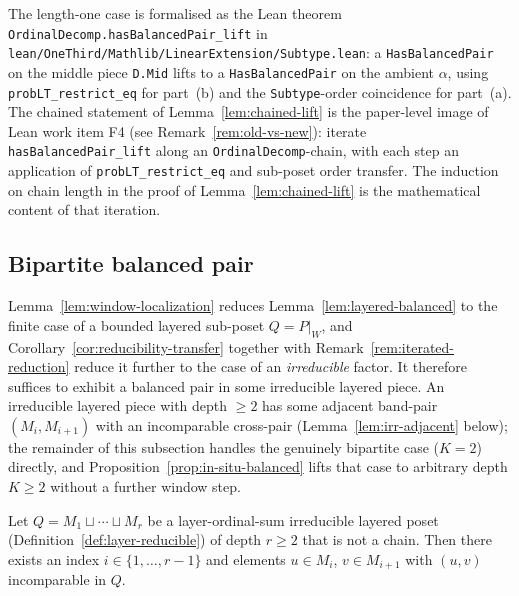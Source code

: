 \begin{remark}
\label{rem:chained-lift-lean}
The length-one case is formalised as the Lean theorem
\texttt{OrdinalDecomp.}\allowbreak\texttt{has\-Balanced\-Pair\_lift}
in \texttt{lean/OneThird/Mathlib/}\allowbreak\texttt{LinearExtension/Subtype.lean}:
a \texttt{HasBalancedPair} on the middle piece \texttt{D.Mid} lifts
to a \texttt{HasBalancedPair} on the ambient $\alpha$, using
\texttt{probLT\_restrict\_eq} for part~(b) and the
\texttt{Subtype}-order coincidence for part~(a). The chained
statement of Lemma~\ref{lem:chained-lift} is the paper-level image
of Lean work item F4 (see Remark~\ref{rem:old-vs-new}): iterate
\texttt{has\-Balanced\-Pair\_lift} along an
\texttt{OrdinalDecomp}-chain, with each step an application of
\texttt{probLT\_restrict\_eq} and sub-poset order transfer. The
induction on chain length in the proof of
Lemma~\ref{lem:chained-lift} is the mathematical content of that
iteration.
\end{remark}

\subsection{Bipartite balanced pair}
\label{subsec:bipartite-balanced}

Lemma~\ref{lem:window-localization} reduces
Lemma~\ref{lem:layered-balanced} to the finite case of a bounded
layered sub-poset $Q = P|_{W}$, and
Corollary~\ref{cor:reducibility-transfer} together with
Remark~\ref{rem:iterated-reduction} reduce it further to the case of
an \emph{irreducible} factor. It therefore suffices to exhibit a
balanced pair in some irreducible layered piece. An irreducible
layered piece with depth $\ge 2$ has some adjacent band-pair
$(M_i, M_{i+1})$ with an incomparable cross-pair
(Lemma~\ref{lem:irr-adjacent} below); the remainder of this
subsection handles the genuinely bipartite case ($K = 2$) directly,
and Proposition~\ref{prop:in-situ-balanced} lifts that case to
arbitrary depth $K \ge 2$ without a further window step.

\begin{lemma}
\label{lem:irr-adjacent}
Let $Q = M_1 \sqcup \cdots \sqcup M_r$ be a layer-ordinal-sum
irreducible layered poset (Definition~\ref{def:layer-reducible}) of
depth $r \ge 2$ that is not a chain. Then there exists an index
$i \in \{1, \ldots, r-1\}$ and elements $u \in M_i$, $v \in M_{i+1}$
with $(u, v)$ incomparable in $Q$.
\end{lemma}


